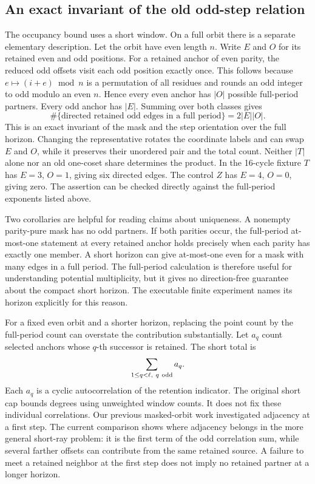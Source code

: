 \documentclass[12pt,letterpaper]{article}
\begin{document}
\subsection{An exact invariant of the old odd-step relation}

The occupancy bound uses a short window. On a full orbit there is a separate elementary description. Let the orbit have even length $n$. Write $E$ and $O$ for its retained even and odd positions. For a retained anchor of even parity, the reduced odd offsets visit each odd position exactly once. This follows because $e\mapsto (i+e)\bmod n$ is a permutation of all residues and rounds an odd integer to odd modulo an even $n$. Hence every even anchor has $|O|$ possible full-period partners. Every odd anchor has $|E|$. Summing over both classes gives
\[
          \#\{\text{directed retained odd edges in a full period}\}
                         =2|E||O|.
\]
This is an exact invariant of the mask and the step orientation over the full horizon. Changing the representative rotates the coordinate labels and can swap $E$ and $O$, while it preserves their unordered pair and the total count. Neither $|T|$ alone nor an old one-coset share determines the product. In the 16-cycle fixture $T$ has $E=3$, $O=1$, giving six directed edges. The control $Z$ has $E=4$, $O=0$, giving zero. The assertion can be checked directly against the full-period exponents listed above.

Two corollaries are helpful for reading claims about uniqueness. A nonempty parity-pure mask has no odd partners. If both parities occur, the full-period at-most-one statement at every retained anchor holds precisely when each parity has exactly one member. A short horizon can give at-most-one even for a mask with many edges in a full period. The full-period calculation is therefore useful for understanding potential multiplicity, but it gives no direction-free guarantee about the compact short horizon. The executable finite experiment names its horizon explicitly for this reason.

For a fixed even orbit and a shorter horizon, replacing the point count by the full-period count can overstate the contribution substantially. Let $a_q$ count selected anchors whose $q$-th successor is retained. The short total is
\[
   \sum_{1\le q<\ell,\ q\ {\rm odd}} a_q .
\]
Each $a_q$ is a cyclic autocorrelation of the retention indicator. The original short cap bounds degrees using unweighted window counts. It does not fix these individual correlations. Our previous masked-orbit work investigated adjacency at a first step. The current comparison shows where adjacency belongs in the more general short-ray problem: it is the first term of the odd correlation sum, while several farther offsets can contribute from the same retained source. A failure to meet a retained neighbor at the first step does not imply no retained partner at a longer horizon.
\end{document}
